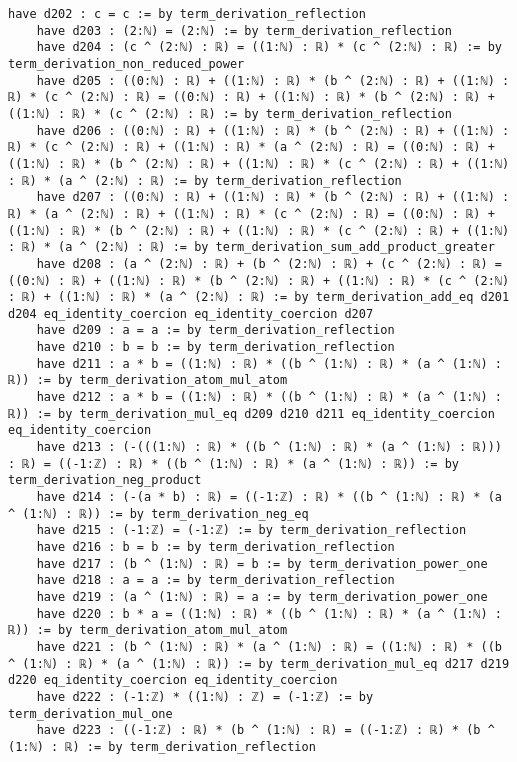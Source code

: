 \documentclass{article}
\begin{document}
\begin{tcolorbox}[colback=white!10, width=\linewidth]
\begin{lstlisting}[language=Lean4]
    have d202 : c = c := by term_derivation_reflection
    have d203 : (2:ℕ) = (2:ℕ) := by term_derivation_reflection
    have d204 : (c ^ (2:ℕ) : ℝ) = ((1:ℕ) : ℝ) * (c ^ (2:ℕ) : ℝ) := by term_derivation_non_reduced_power
    have d205 : ((0:ℕ) : ℝ) + ((1:ℕ) : ℝ) * (b ^ (2:ℕ) : ℝ) + ((1:ℕ) : ℝ) * (c ^ (2:ℕ) : ℝ) = ((0:ℕ) : ℝ) + ((1:ℕ) : ℝ) * (b ^ (2:ℕ) : ℝ) + ((1:ℕ) : ℝ) * (c ^ (2:ℕ) : ℝ) := by term_derivation_reflection
    have d206 : ((0:ℕ) : ℝ) + ((1:ℕ) : ℝ) * (b ^ (2:ℕ) : ℝ) + ((1:ℕ) : ℝ) * (c ^ (2:ℕ) : ℝ) + ((1:ℕ) : ℝ) * (a ^ (2:ℕ) : ℝ) = ((0:ℕ) : ℝ) + ((1:ℕ) : ℝ) * (b ^ (2:ℕ) : ℝ) + ((1:ℕ) : ℝ) * (c ^ (2:ℕ) : ℝ) + ((1:ℕ) : ℝ) * (a ^ (2:ℕ) : ℝ) := by term_derivation_reflection
    have d207 : ((0:ℕ) : ℝ) + ((1:ℕ) : ℝ) * (b ^ (2:ℕ) : ℝ) + ((1:ℕ) : ℝ) * (a ^ (2:ℕ) : ℝ) + ((1:ℕ) : ℝ) * (c ^ (2:ℕ) : ℝ) = ((0:ℕ) : ℝ) + ((1:ℕ) : ℝ) * (b ^ (2:ℕ) : ℝ) + ((1:ℕ) : ℝ) * (c ^ (2:ℕ) : ℝ) + ((1:ℕ) : ℝ) * (a ^ (2:ℕ) : ℝ) := by term_derivation_sum_add_product_greater
    have d208 : (a ^ (2:ℕ) : ℝ) + (b ^ (2:ℕ) : ℝ) + (c ^ (2:ℕ) : ℝ) = ((0:ℕ) : ℝ) + ((1:ℕ) : ℝ) * (b ^ (2:ℕ) : ℝ) + ((1:ℕ) : ℝ) * (c ^ (2:ℕ) : ℝ) + ((1:ℕ) : ℝ) * (a ^ (2:ℕ) : ℝ) := by term_derivation_add_eq d201 d204 eq_identity_coercion eq_identity_coercion d207
    have d209 : a = a := by term_derivation_reflection
    have d210 : b = b := by term_derivation_reflection
    have d211 : a * b = ((1:ℕ) : ℝ) * ((b ^ (1:ℕ) : ℝ) * (a ^ (1:ℕ) : ℝ)) := by term_derivation_atom_mul_atom
    have d212 : a * b = ((1:ℕ) : ℝ) * ((b ^ (1:ℕ) : ℝ) * (a ^ (1:ℕ) : ℝ)) := by term_derivation_mul_eq d209 d210 d211 eq_identity_coercion eq_identity_coercion
    have d213 : (-(((1:ℕ) : ℝ) * ((b ^ (1:ℕ) : ℝ) * (a ^ (1:ℕ) : ℝ))) : ℝ) = ((-1:ℤ) : ℝ) * ((b ^ (1:ℕ) : ℝ) * (a ^ (1:ℕ) : ℝ)) := by term_derivation_neg_product
    have d214 : (-(a * b) : ℝ) = ((-1:ℤ) : ℝ) * ((b ^ (1:ℕ) : ℝ) * (a ^ (1:ℕ) : ℝ)) := by term_derivation_neg_eq
    have d215 : (-1:ℤ) = (-1:ℤ) := by term_derivation_reflection
    have d216 : b = b := by term_derivation_reflection
    have d217 : (b ^ (1:ℕ) : ℝ) = b := by term_derivation_power_one
    have d218 : a = a := by term_derivation_reflection
    have d219 : (a ^ (1:ℕ) : ℝ) = a := by term_derivation_power_one
    have d220 : b * a = ((1:ℕ) : ℝ) * ((b ^ (1:ℕ) : ℝ) * (a ^ (1:ℕ) : ℝ)) := by term_derivation_atom_mul_atom
    have d221 : (b ^ (1:ℕ) : ℝ) * (a ^ (1:ℕ) : ℝ) = ((1:ℕ) : ℝ) * ((b ^ (1:ℕ) : ℝ) * (a ^ (1:ℕ) : ℝ)) := by term_derivation_mul_eq d217 d219 d220 eq_identity_coercion eq_identity_coercion
    have d222 : (-1:ℤ) * ((1:ℕ) : ℤ) = (-1:ℤ) := by term_derivation_mul_one
    have d223 : ((-1:ℤ) : ℝ) * (b ^ (1:ℕ) : ℝ) = ((-1:ℤ) : ℝ) * (b ^ (1:ℕ) : ℝ) := by term_derivation_reflection

\end{lstlisting}
\end{tcolorbox}
\end{document}
